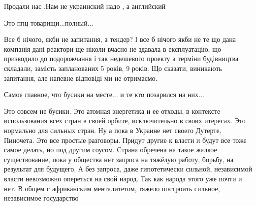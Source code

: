 \begin{itemize}
Продали нас .Нам не украинский надо , а английский

 
Это ппц товарищи...полный...

 

Все б нічого, якби не запитання, а тендер? І все б нічого якби не те що дана
компанія дані реактори ще ніколи вчасно не здавала в експлуатацію, що
призводило до подорожчання і так недешевого проекту а терміни будівництва
складали, замість запланованих 5 років, 9 років. Що сказати, виникають
запитання, але напевне відповіді ми не отримаємо.


 
Самое главное, что бусики на месте... и те кто позарился на них...


Это совсем не бусики. Это атомная энергетика и ее отходы, в контексте
использования всех стран в своей орбите, исключительно в своих итересах. Это
нормально для сильных стран. Ну а пока в Украине нет своего Дутерте, Пиночета.
Это все простые разговоры. Придут другие к власти и будут все тоже самое
делать, но под другим соусом. Страна обречена на такое жалкое существование,
пока у общества нет запроса на тяжёлую работу, борьбу, на результат для
будущего. А без запроса, даже гипотетически сильной, независимой власти
невозможно опереться на свой народ. Так как народа этого уже почти и нет. В
общем с африканским менталитетом, тяжело построить сильное, независимое
государство

\begin{itemize}
 

\end{itemize}
\end{itemize}
